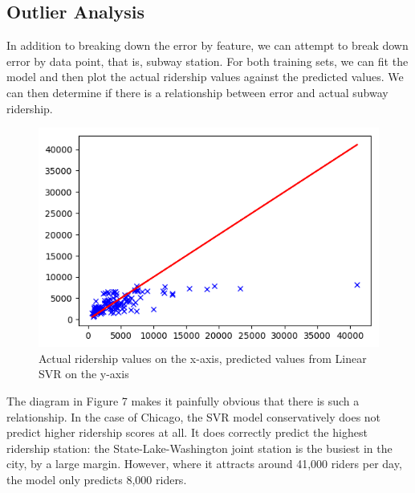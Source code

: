 \documentclass{article}
\begin{document}
\subsection{Outlier Analysis}

In addition to breaking down the error by feature, we can attempt to break down error by data point, that is, subway station. For both training sets, we can fit the model and then plot the actual ridership values against the predicted values. We can then determine if there is a relationship between error and actual subway ridership. 

\begin{figure}[H]\label{fig:f7}
\begin{center}\includegraphics[scale=1]{actual_vs_predicted_chi}\end{center}
\caption{Actual ridership values on the x-axis, predicted values from Linear SVR on the y-axis}
\end{figure}

The diagram in Figure 7 makes it painfully obvious that there is such a relationship. In the case of Chicago, the SVR model conservatively does not predict higher ridership scores at all. It does correctly predict the highest ridership station: the State-Lake-Washington joint station is the busiest in the city, by a large margin. However, where it attracts around 41,000 riders per day, the model only predicts 8,000 riders. 
\end{document}
